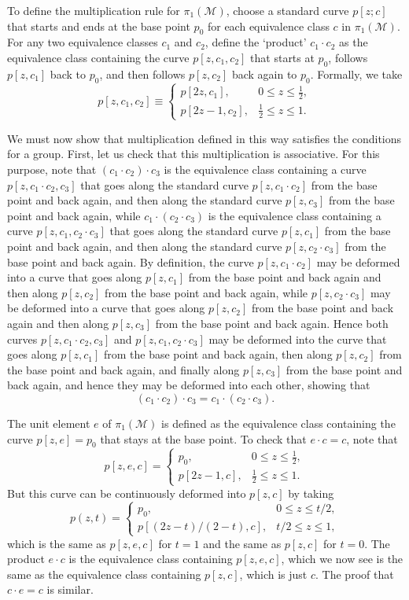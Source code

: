 To define the multiplication rule for $\pi_1(\mathcal M)$, choose a
standard curve $p[z;c]$ that starts and ends at the base point $p_0$ for
each equivalence class $c$ in $\pi_1(\mathcal M)$. For any two equivalence
classes $c_1$ and $c_2$, define the `product' $c_1\cdot c_2$ as the
equivalence class containing the curve $p[z,c_1,c_2]$ that starts at
$p_0$, follows $p[z,c_1]$ back to $p_0$, and then follows $p[z,c_2]$ back
again to $p_0$. Formally, we take
\[
 p[z,c_1,c_2]\equiv
 \begin{cases}
  p[2z,c_1],&0\leq z\leq\tfrac12,\\
  p[2z-1,c_2],&\tfrac12\leq z\leq1.
 \end{cases}
\]

We must now show that multiplication defined in this way satisfies the
conditions for a group. First, let us check that this multiplication is
associative. For this purpose, note that $(c_1\cdot c_2)\cdot c_3$ is the
equivalence class containing a curve $p[z,c_1\cdot c_2,c_3]$ that goes
along the standard curve $p[z,c_1\cdot c_2]$ from the base point and back
again, and then along the standard curve $p[z,c_3]$ from the base point
and back again, while $c_1\cdot(c_2\cdot c_3)$ is the equivalence class
containing a curve $p[z,c_1,c_2\cdot c_3]$ that goes along the standard
curve $p[z,c_1]$ from the base point and back again, and then along the
standard curve $p[z,c_2\cdot c_3]$ from the base point and back again. By
definition, the curve $p[z,c_1\cdot c_2]$ may be deformed into a curve that
goes along $p[z,c_1]$ from the base point and back again and then along
$p[z,c_2]$ from the base point and back again, while
$p[z,c_2\cdot c_3]$ may be deformed into a curve that goes along
$p[z,c_2]$ from the base point and back again and then along $p[z,c_3]$
from the base point and back again. Hence both curves
$p[z,c_1\cdot c_2,c_3]$ and $p[z,c_1,c_2\cdot c_3]$ may be deformed into
the curve that goes along $p[z,c_1]$ from the base point and back again,
then along $p[z,c_2]$ from the base point and back again, and finally
along $p[z,c_3]$ from the base point and back again, and hence they may
be deformed into each other, showing that
\[
 (c_1\cdot c_2)\cdot c_3=c_1\cdot(c_2\cdot c_3).
\]

The unit element $e$ of $\pi_1(\mathcal M)$ is defined as the equivalence
class containing the curve $p[z,e]=p_0$ that stays at the base point. To
check that $e\cdot c=c$, note that
\[
 p[z,e,c]=
 \begin{cases}
  p_0,&0\leq z\leq\tfrac12,\\
  p[2z-1,c],&\tfrac12\leq z\leq1.
 \end{cases}
\]
But this curve can be continuously deformed into $p[z,c]$ by taking
\[
 p(z,t)=
 \begin{cases}
  p_0,&0\leq z\leq t/2,\\
  p[(2z-t)/(2-t),c],&t/2\leq z\leq1,
 \end{cases}
\]
which is the same as $p[z,e,c]$ for $t=1$ and the same as $p[z,c]$ for
$t=0$. The product $e\cdot c$ is the equivalence class containing
$p[z,e,c]$, which we now see is the same as the equivalence class
containing $p[z,c]$, which is just $c$. The proof that $c\cdot e=c$ is
similar.


